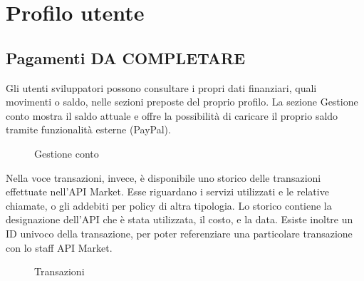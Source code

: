 \newpage
\section{Profilo utente}




\subsection{Pagamenti DA COMPLETARE}

Gli utenti sviluppatori possono consultare i propri dati finanziari, quali movimenti o saldo, nelle sezioni preposte del proprio profilo. La sezione Gestione conto mostra il saldo attuale e offre la possibilità di caricare il proprio saldo tramite funzionalità esterne (PayPal).

\label{Gestione conto}
\begin{figure}[H]
	\centering
	\caption{Gestione conto}
\end{figure}

Nella voce transazioni, invece, è disponibile uno storico delle transazioni effettuate nell'API Market. Esse riguardano i servizi utilizzati e le relative chiamate, o gli addebiti per policy di altra tipologia. Lo storico contiene la designazione dell'API che è stata utilizzata, il costo, e la data. Esiste inoltre un ID univoco della transazione, per poter referenziare una particolare transazione con lo staff API Market.

\label{Transazioni}
\begin{figure}[H]
	\centering
	\caption{Transazioni}
\end{figure}
